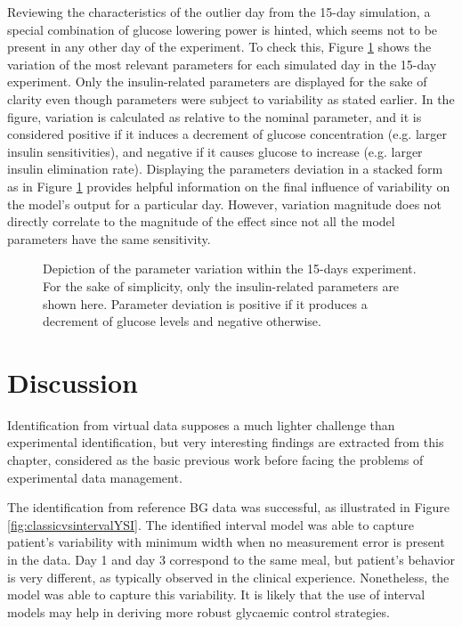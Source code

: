 Reviewing the characteristics of the outlier day from the 15-day simulation, a special combination of glucose lowering power is hinted, which seems not to be present in any other day of the experiment. To check this, Figure \ref{fig:parametersperdaystack} shows the variation of the most relevant parameters for each simulated day in the 15-day experiment. Only the insulin-related parameters are displayed for the sake of clarity even though parameters were subject to variability as stated earlier. In the figure, variation is calculated as relative to the nominal parameter, and it is considered positive if it induces a decrement of glucose concentration (e.g. larger insulin sensitivities), and negative if it causes glucose to increase (e.g. larger insulin elimination rate). Displaying the parameters deviation in a stacked form as in Figure \ref{fig:parametersperdaystack} provides helpful information on the final influence of variability on the model's output for a particular day. However, variation magnitude does not directly correlate to the magnitude of the effect since not all the model parameters have the same sensitivity.

\begin{figure}[hbtp]
\centering
{}\caption{Depiction of the parameter variation within the 15-days experiment. For the sake of simplicity, only the insulin-related parameters are shown here. Parameter deviation is positive if it produces a decrement of glucose levels and negative otherwise.}
\label{fig:parametersperdaystack}
\end{figure}

\section{Discussion}
\label{sec:Discussion}

Identification from virtual data supposes a much lighter challenge than experimental identification, but very interesting findings are extracted from this chapter, considered as the basic previous work before facing the problems of experimental data management.
	
The identification from reference BG data was successful, as illustrated in Figure \ref{fig:classicvsintervalYSI}. The identified interval model was able to capture patient's variability with minimum width when no measurement error is present in the data. Day 1 and day 3 correspond to the same meal, but patient's behavior is very different, as typically observed in the clinical experience. Nonetheless, the model was able to capture this variability. It is likely that the use of interval models may help in deriving more robust glycaemic control strategies.

